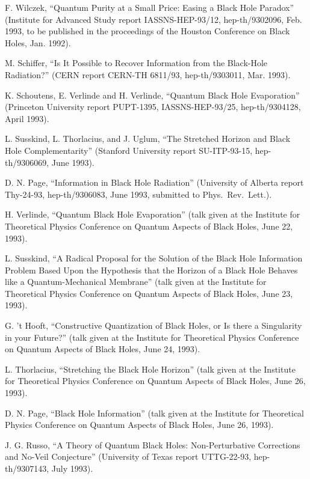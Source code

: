 \begin{thebibliography}{999}
 F. Wilczek, ``Quantum Purity at a Small Price: Easing a
Black
Hole Paradox'' (Institute for Advanced Study report IASSNS-HEP-93/12,
hep-th/9302096, Feb. 1993, to be published in the proceedings of the
Houston
Conference on Black Holes, Jan. 1992).

 M. Schiffer, ``Is It Possible to Recover
Information
from the Black-Hole Radiation?'' (CERN report CERN-TH 6811/93,
hep-th/9303011, Mar. 1993).

 K. Schoutens, E. Verlinde and H. Verlinde, ``Quantum
Black
Hole
Evaporation'' (Princeton University report PUPT-1395,
IASSNS-HEP-93/25,
hep-th/9304128, April 1993).

 L. Susskind, L. Thorlacius, and J. Uglum, ``The
Stretched
Horizon and Black Hole Complementarity'' (Stanford University report
SU-ITP-93-15, hep-th/9306069, June 1993).

 D. N. Page, ``Information in Black Hole Radiation''
(University of Alberta report Thy-24-93, hep-th/9306083, June 1993,
submitted to Phys.\ Rev.\ Lett.).

 H. Verlinde, ``Quantum Black Hole Evaporation''
(talk given at the Institute for Theoretical Physics Conference on
Quantum Aspects of Black Holes, June 22, 1993).

 L. Susskind, ``A Radical Proposal for the Solution
of the Black Hole Information Problem Based Upon the Hypothesis
that the Horizon of a Black Hole Behaves like a
Quantum-Mechanical Membrane''
(talk given at the Institute for Theoretical Physics Conference
on Quantum Aspects of Black Holes, June 23, 1993).

 G. 't Hooft, ``Constructive Quantization of
Black Holes, or Is there a Singularity in your Future?''
(talk given at the Institute for Theoretical Physics Conference
on Quantum Aspects of Black Holes, June 24, 1993).

 L. Thorlacius, ``Stretching the Black Hole Horizon''
(talk given at the Institute for Theoretical Physics Conference
on Quantum Aspects of Black Holes, June 26, 1993).

 D. N. Page, ``Black Hole Information''
(talk given at the Institute for Theoretical Physics Conference
on Quantum Aspects of Black Holes, June 26, 1993).

 J. G. Russo, ``A Theory of Quantum Black Holes:
Non-Perturbative Corrections and No-Veil Conjecture''
(University of Texas report UTTG-22-93, hep-th/9307143, July 1993).


\end{thebibliography}
